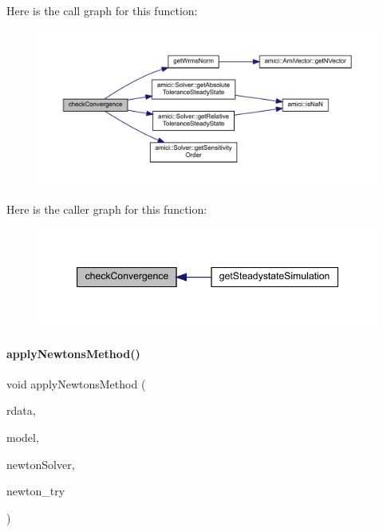 Here is the call graph for this function\+:
\nopagebreak
\begin{figure}[H]
\begin{center}
\leavevmode
\includegraphics[width=350pt]{classamici_1_1_steadystate_problem_a06f944df556560112e76a23213bf3f51_cgraph}
\end{center}
\end{figure}
Here is the caller graph for this function\+:
\nopagebreak
\begin{figure}[H]
\begin{center}
\leavevmode
\includegraphics[width=347pt]{classamici_1_1_steadystate_problem_a06f944df556560112e76a23213bf3f51_icgraph}
\end{center}
\end{figure}
\mbox{\label{classamici_1_1_steadystate_problem_a1c33ff72fd843a1a51cd93448e3e5a77}} 
\paragraph{\texorpdfstring{apply\+Newtons\+Method()}{applyNewtonsMethod()}}
{\footnotesize\ttfamily void apply\+Newtons\+Method (\begin{DoxyParamCaption}\item[{\mbox{\hyperlink{classamici_1_1_return_data}{Return\+Data}} $\ast$}]{rdata,  }\item[{\mbox{\hyperlink{classamici_1_1_model}{Model}} $\ast$}]{model,  }\item[{\mbox{\hyperlink{classamici_1_1_newton_solver}{Newton\+Solver}} $\ast$}]{newton\+Solver,  }\item[{int}]{newton\+\_\+try }\end{DoxyParamCaption})}

